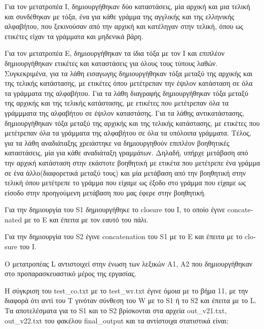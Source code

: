 \documentclass{article}
\begin{document}
Για τον μετατροπέα Ι, δημιουργήθηκαν δύο καταστάσεις, μία αρχική και μια τελική και συνδέθηκαν με τόξα, ένα για κάθε γράμμα της αγγλικής και της ελληνικής αλφαβήτου, που ξεκινούσαν από την αρχική και κατέληγαν στην τελική, όπου ως ετικέτες είχαν τα γράμματα και μηδενικά βάρη. \par
Για τον μετατροπέα Ε, δημιουργήθηκαν τα ίδια τόξα με τον Ι και επιπλέον δημιουργήθηκαν ετικέτες και καταστάσεις για όλους τους τύπους λαθών. Συγκεκριμένα, για τα λάθη εισαγωγης δημιουργήθηκαν τόξα μεταξύ της αρχικής και της τελικής κατάστασης, με ετικέτες όπου μετέτρεπαν την έψιλον κατάσταση σε όλα τα γράμματα της αλφαβήτου. Για τα λάθη διαγραφής δημιουργήθηκαν τόξα μεταξύ της αρχικής και της τελικής κατάστασης, με ετικέτες που μετέτρεπαν όλα τα γράμμματα της αλφαβήτου σε έψιλον καταστάσης. Για τα λάθης αντικατάστασης, δημιουργήθηκαν τόξα μεταξύ της αρχικής και της τελικής κατάστασης, με ετικέτες που μετέτρεπαν όλα τα γράμματα της αλφαβήτου σε όλα τα υπόλοιπα γράμματα. Τέλος, για τα λάθη αναδιάταξης χρειάστηκε να δημιουργηθούν επιπλέον βοηθητικές καταστάσεις, μία για κάθε αναδιάταξη γραμμάτων. Δηλαδή, υπήρχε μετάβαση από την αρχική κατάσταση στην εκάστοτε βοηθητική με ετικέτα που μετέτρεπε ένα γράμμα σε ένα άλλο(διαφορετικά μεταξύ τους) και μία μετάβαση από την βοηθητική στην τελική όπου μετέτρεπε το γράμμα που είχαμε ως έξοδο στο γράμμα που είχαμε ως είσοδο στην προηγούμενη μετάβαση που μας έφερε στην βοηθητική. \par
Για την δημιουργία του \textlatin{S1} δημιουργήθηκε το \textlatin{closure} του I, το οποίο έγινε \textlatin{concatenated} με το Ε και έπειτα με τον εαυτό του πάλι. \par
Για την δημιουργία του \textlatin{S2} έγινε \textlatin{concatenation} του \textlatin{S1} με το Ε και έπειτα με το \textlatin{closure} του Ι. \par
Ο μετατροπέας \textlatin{L} αντιστοιχεί στην ένωση των λεξικών Α1, Α2 που δημιουργήθηκαν στο προπαρασκευαστικό μέρος της εργασίας. \par
Η σύγκριση του \textlatin{test\_co.txt} με το \textlatin{test\_wr.txt} έγινε όμοια με το βήμα 11, με την διαφορά ότι αντί του Τ γινόταν σύνθεση του \textlatin{W} με το \textlatin{S1} ή το \textlatin{S2} και έπειτα με το \textlatin{L}.
\newpage
Τα αποτελέσματα για το \textlatin{S1} και το \textlatin{S2} βρίσκονται στα αρχεία \textlatin{out\_v21.txt, out\_v22.txt} του φακέλου \textlatin{final\_output} και τα αντίστοιχα στατιστικά είναι: \\
\end{document}
